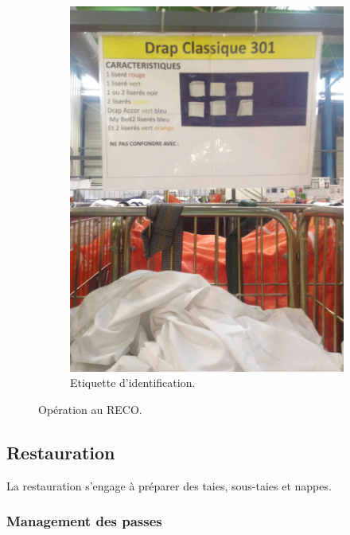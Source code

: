 \documentclass{article}
\newcommand{\rapportFigure}{0.075}
\begin{document}
\begin{figure}[h]
\begin{subfigure}{0.49\textwidth}
        \includegraphics[angle=-90,scale= \rapportFigure]{images/reco_fiche}
        \caption{Etiquette d'identification.}
        \label{fig:etiquette_reco}
    \end{subfigure}
    
    \caption{Opération au RECO.}
\end{figure}
%
\FloatBarrier

\newpage 

\subsection{Restauration}

La restauration s'engage à préparer des taies, sous-taies et nappes.

\subsubsection{Management des passes}
\end{document}
